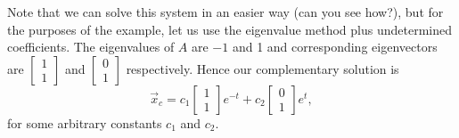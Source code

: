 \begin{exampleSol}
Note that we can solve this system in an easier way (can you see how?), but
for the purposes of the example, let us use the eigenvalue method plus
undetermined coefficients.
The eigenvalues of $A$ are 
$-1$ and 1 and corresponding eigenvectors
are
$\left[ \begin{smallmatrix}
1 \\
1
\end{smallmatrix} \right]$ and
$\left[ \begin{smallmatrix}
0 \\
1
\end{smallmatrix} \right]$ respectively.
Hence our complementary solution is
\begin{equation*}
\vec{x}_c = 
c_1
\begin{bmatrix}
1 \\ 1
\end{bmatrix}
e^{-t}
+
c_2
\begin{bmatrix}
0 \\ 1
\end{bmatrix}
e^{t} ,
\end{equation*}
for some arbitrary constants $c_1$ and $c_2$.


\end{exampleSol}
